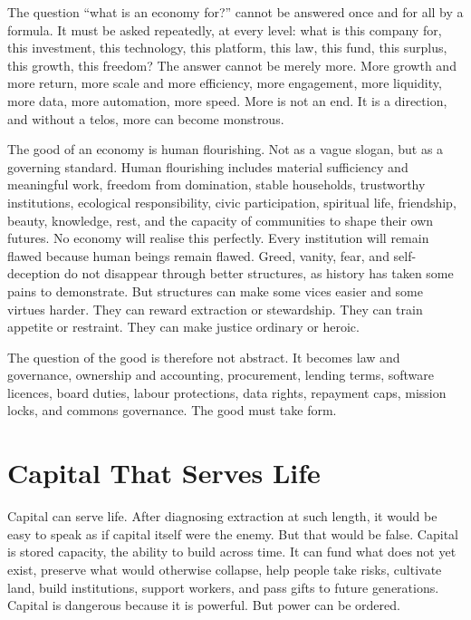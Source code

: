 \documentclass[11pt,a4paper,oneside]{book}
\begin{document}
The question ``what is an economy for?'' cannot be answered once and for all by a formula. It must be asked repeatedly, at every level: what is this company for, this investment, this technology, this platform, this law, this fund, this surplus, this growth, this freedom? The answer cannot be merely more. More growth and more return, more scale and more efficiency, more engagement, more liquidity, more data, more automation, more speed. More is not an end. It is a direction, and without a telos, more can become monstrous.

The good of an economy is human flourishing. Not as a vague slogan, but as a governing standard. Human flourishing includes material sufficiency and meaningful work, freedom from domination, stable households, trustworthy institutions, ecological responsibility, civic participation, spiritual life, friendship, beauty, knowledge, rest, and the capacity of communities to shape their own futures. No economy will realise this perfectly. Every institution will remain flawed because human beings remain flawed. Greed, vanity, fear, and self-deception do not disappear through better structures, as history has taken some pains to demonstrate. But structures can make some vices easier and some virtues harder. They can reward extraction or stewardship. They can train appetite or restraint. They can make justice ordinary or heroic.

The question of the good is therefore not abstract. It becomes law and governance, ownership and accounting, procurement, lending terms, software licences, board duties, labour protections, data rights, repayment caps, mission locks, and commons governance. The good must take form.

\section*{Capital That Serves Life}

Capital can serve life. After diagnosing extraction at such length, it would be easy to speak as if capital itself were the enemy. But that would be false. Capital is stored capacity, the ability to build across time. It can fund what does not yet exist, preserve what would otherwise collapse, help people take risks, cultivate land, build institutions, support workers, and pass gifts to future generations. Capital is dangerous because it is powerful. But power can be ordered.
\end{document}
